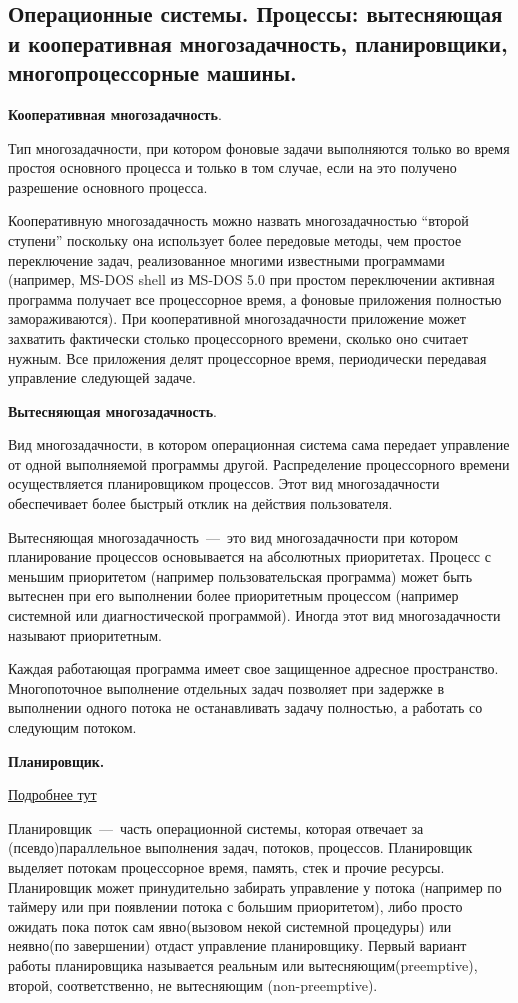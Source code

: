 \subsection{Операционные системы. Процессы: вытесняющая и кооперативная многозадачность, планировщики, многопроцессорные машины.}

\textbf{Кооперативная многозадачность}.

Тип многозадачности, при котором фоновые задачи выполняются только во время простоя основного процесса и только в том случае, если на это получено разрешение основного процесса.

Кооперативную многозадачность можно назвать многозадачностью “второй ступени” поскольку она использует более передовые методы, чем простое переключение задач, реализованное многими известными программами (например, МS-DOS shell из МS-DOS 5.0 при простом переключении активная программа получает все процессорное время, а фоновые приложения полностью замораживаются). При кооперативной многозадачности приложение может захватить фактически столько процессорного времени, сколько оно считает нужным. Все приложения делят процессорное время, периодически передавая управление следующей задаче.

\textbf{ Вытесняющая многозадачность}.

Вид многозадачности, в котором операционная система сама передает управление от одной выполняемой программы другой. Распределение процессорного времени осуществляется планировщиком процессов. Этот вид многозадачности обеспечивает более быстрый отклик на действия пользователя.

Вытесняющая многозадачность~---~это вид многозадачности при котором планирование процессов основывается на абсолютных приоритетах. Процесс с меньшим приоритетом (например пользовательская программа) может быть вытеснен при его выполнении более приоритетным процессом (например системной или диагностической программой). Иногда этот вид многозадачности называют приоритетным.

Каждая работающая программа имеет свое защищенное адресное пространство. Многопоточное выполнение отдельных задач позволяет при задержке в выполнении одного потока не останавливать задачу полностью, а работать со следующим потоком.

\textbf{Планировщик.}

\href{https://habr.com/ru/post/154609/}{Подробнее тут}

Планировщик~---~часть операционной системы, которая отвечает за (псевдо)параллельное выполнения задач, потоков, процессов. Планировщик выделяет потокам процессорное время, память, стек и прочие ресурсы. Планировщик может принудительно забирать управление у потока (например по таймеру или при появлении потока с большим приоритетом), либо просто ожидать пока поток сам явно(вызовом некой системной процедуры) или неявно(по завершении) отдаст управление планировщику.
Первый вариант работы планировщика называется реальным или вытесняющим(preemptive), второй, соответственно, не вытесняющим (non-preemptive).

